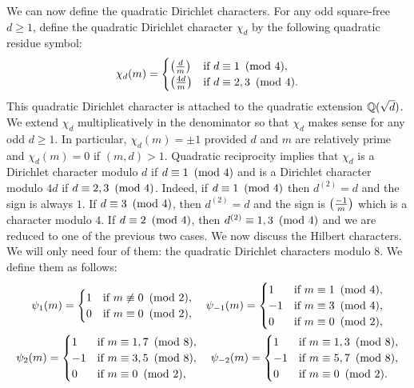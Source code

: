 \documentclass[12pt,reqno,oneside]{amsart}
\begin{document}
    We can now define the quadratic Dirichlet characters. For any odd square-free $d \ge 1$, define the quadratic Dirichlet character $\chi_{d}$ by the following quadratic residue symbol:
    \[
        \chi_{d}(m) = \begin{cases} \left(\frac{d}{m}\right) & \text{if $d \equiv 1 \ \left(\text{mod }4\right)$}, \\ \left(\frac{4d}{m}\right) & \text{if $d \equiv 2,3 \ \left(\text{mod }4\right)$}. \end{cases}
    \]
    This quadratic Dirichlet character is attached to the quadratic extension $\mathbb{Q}(\sqrt{d})$. We extend $\chi_{d}$ multiplicatively in the denominator so that $\chi_{d}$ makes sense for any odd $d \ge 1$. In particular, $\chi_{d}(m) = \pm1$ provided $d$ and $m$ are relatively prime and $\chi_{d}(m) = 0$ if $(m,d) > 1$. Quadratic reciprocity implies that $\chi_{d}$ is a Dirichlet character modulo $d$ if $d \equiv 1 \ \left(\text{mod }4\right)$ and is a Dirichlet character modulo $4d$ if $d \equiv 2,3 \ \left(\text{mod }4\right)$. Indeed, if $d \equiv 1 \ \left(\text{mod }4\right)$ then $d^{(2)} = d$ and the sign is always $1$. If $d \equiv 3 \ \left(\text{mod }4\right)$, then $d^{(2)} = d$ and the sign is $\textstyle{\left(\frac{-1}{m}\right)}$ which is a character modulo $4$. If $d \equiv 2 \ \left(\text{mod }4\right)$, then $d^{(2)} \equiv 1,3 \ \left(\text{mod }4\right)$ and we are reduced to one of the previous two cases. We now discuss the Hilbert characters. We will only need four of them: the quadratic Dirichlet characters modulo $8$. We define them as follows:
    \begin{gather*}
        \psi_{1}(m) = \begin{cases} 1 &\text{if $m \not\equiv 0 \ \left(\text{mod }2\right)$}, \\ 0 &\text{if $m \equiv 0 \ \left(\text{mod }2\right)$}, \end{cases} \quad \psi_{-1}(m) = \begin{cases} 1 &\text{if $m \equiv 1 \ \left(\text{mod }4\right)$}, \\ -1 &\text{if $m \equiv 3 \ \left(\text{mod }4\right)$}, \\ 0 &\text{if $m \equiv 0 \ \left(\text{mod }2\right)$}, \end{cases} \\ \psi_{2}(m) = \begin{cases} 1 &\text{if $m \equiv 1,7 \ \left(\text{mod }8\right)$}, \\ -1 &\text{if $m \equiv 3,5 \ \left(\text{mod }8\right)$}, \\ 0 &\text{if $m \equiv 0 \ \left(\text{mod }2\right)$}, \end{cases} \quad \psi_{-2}(m) = \begin{cases} 1 &\text{if $m \equiv 1,3 \ \left(\text{mod }8\right)$}, \\ -1 &\text{if $m \equiv 5,7 \ \left(\text{mod }8\right)$}, \\ 0 &\text{if $m \equiv 0 \ \left(\text{mod }2\right)$}. \end{cases}
    \end{gather*}
\end{document}
